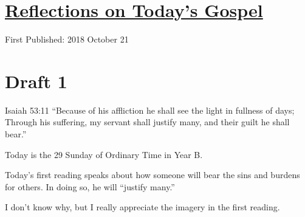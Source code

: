 \documentclass[12pt]{article}[titlepage]
\newcommand{\say}[1]{``#1''}
\newcommand{\1}{\={a}}
\newcommand{\2}{\={e}}
\newcommand{\3}{\={\i}}
\newcommand{\4}{\=o}
\newcommand{\5}{\=u}
\newcommand{\6}{\={A}}
\renewcommand{\,}{\textsuperscript{,}}
\begin{document}
\doublespacing
\section{\href{reflections-on-readings-29-ordinary-b.html}{Reflections on Today's Gospel}}
First Published: 2018 October 21
\section{Draft 1}
Isaiah 53:11 \say{Because of his affliction he shall see the light in fullness of days; Through his suffering, my servant shall justify many, and their guilt he shall bear.}

Today is the 29 Sunday of Ordinary Time in Year B.

Today's first reading speaks about how someone will bear the sins and burdens for others.
In doing so, he will \say{justify many.}

I don't know why, but I really appreciate the imagery in the first reading.
\end{document}
